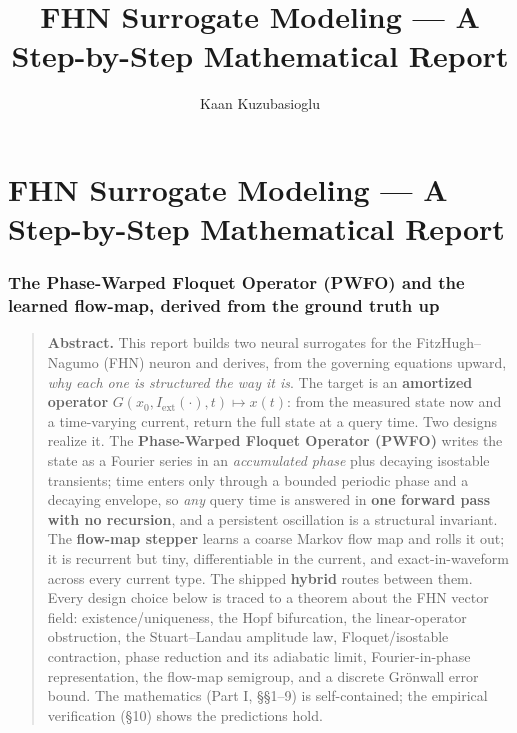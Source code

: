 \documentclass[
  11pt,
]{article}
\title{FHN Surrogate Modeling --- A Step-by-Step Mathematical Report}
\author{Kaan Kuzubasioglu}
\date{}
\begin{document}
\maketitle

\renewcommand*\contentsname{Contents}
{
\setcounter{tocdepth}{3}
\tableofcontents
}
\section{FHN Surrogate Modeling --- A Step-by-Step Mathematical
Report}\label{fhn-surrogate-modeling-a-step-by-step-mathematical-report}

\subsubsection{The Phase-Warped Floquet Operator (PWFO) and the learned
flow-map, derived from the ground truth
up}\label{the-phase-warped-floquet-operator-pwfo-and-the-learned-flow-map-derived-from-the-ground-truth-up}

\begin{quote}
\textbf{Abstract.} This report builds two neural surrogates for the
FitzHugh--Nagumo (FHN) neuron and derives, from the governing equations
upward, \emph{why each one is structured the way it is}. The target is
an \textbf{amortized operator}
\(G(x_0, I_{\mathrm{ext}}(\cdot), t)\mapsto x(t)\): from the measured
state now and a time-varying current, return the full state at a query
time. Two designs realize it. The \textbf{Phase-Warped Floquet Operator
(PWFO)} writes the state as a Fourier series in an \emph{accumulated
phase} plus decaying isostable transients; time enters only through a
bounded periodic phase and a decaying envelope, so \emph{any} query time
is answered in \textbf{one forward pass with no recursion}, and a
persistent oscillation is a structural invariant. The \textbf{flow-map
stepper} learns a coarse Markov flow map and rolls it out; it is
recurrent but tiny, differentiable in the current, and exact-in-waveform
across every current type. The shipped \textbf{hybrid} routes between
them. Every design choice below is traced to a theorem about the FHN
vector field: existence/uniqueness, the Hopf bifurcation, the
linear-operator obstruction, the Stuart--Landau amplitude law,
Floquet/isostable contraction, phase reduction and its adiabatic limit,
Fourier-in-phase representation, the flow-map semigroup, and a discrete
Grönwall error bound. The mathematics (Part I, §§1--9) is
self-contained; the empirical verification (§10) shows the predictions
hold.
\end{quote}
\end{document}
